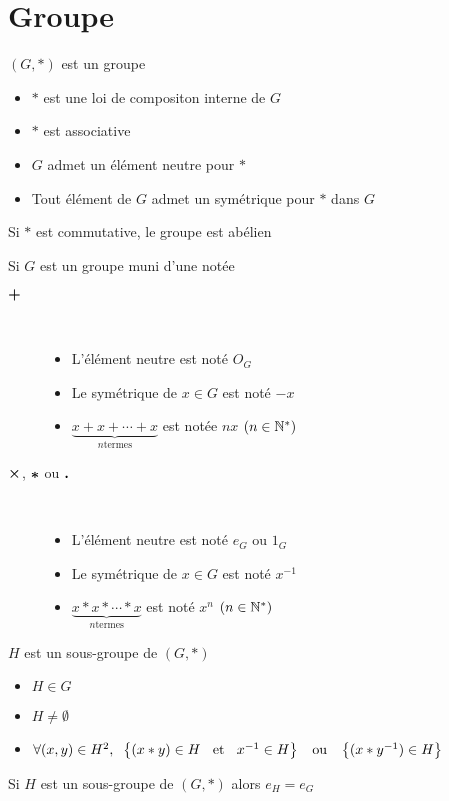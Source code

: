\section{Groupe}

\begin{dfn}[Groupe]
$(G, *)$ est un groupe \ssi
\begin{itemize}
    \item $*$ est une loi de compositon interne de $G$
    \item $*$ est associative
    \item $G$ admet un élément neutre pour $*$
    \item Tout élément de $G$ admet un symétrique pour $*$ dans $G$
\end{itemize}
Si $*$ est commutative, le groupe est abélien
\end{dfn}

\pagebreak

\begin{dfn}
Si $G$ est un groupe muni d'une \lci notée
\begin{description}
    \item[$\boldsymbol{+}$] \quad \\
    \begin{itemize}
        \item L'élément neutre est noté $O_G$
        \item Le symétrique de $x \in G$ est noté $-x$
        \item $\underbrace{x + x + \dotsb + x}_{n \text{termes}}$
        est notée $nx$ $(n \in \mathbb{N}^*)$
    \end{itemize}
    \item[$\boldsymbol{\times}$, $\boldsymbol{*}$ ou $\boldsymbol{.}$] \quad \\
    \begin{itemize}
        \item L'élément neutre est noté $e_G$ ou $1_G$
        \item Le symétrique de $x \in G$ est noté $x^{-1}$
        \item $\underbrace{x * x * \dotsb * x}_{n \text{termes}}$
        est noté $x^n$ $(n \in \mathbb{N}^*)$
    \end{itemize}
\end{description}
\end{dfn}

\begin{dfn}
$H$ est un sous-groupe de $(G, *)$ \ssi
\begin{itemize}
    \item $H \in G$
    \item $H \neq \emptyset$
    \item $\forall (x, y) \in H^2, \;\;
    \left\{(x * y) \in H \;\;\text{ et }\;\; x^{-1} \in H\right\}
    \;\;\text{ ou }\;\; \left\{(x * y^{-1}) \in H\right\}$
\end{itemize}
\end{dfn}

\begin{rem}
Si $H$ est un sous-groupe de $(G, *)$ alors $e_H = e_G$
\end{rem}


